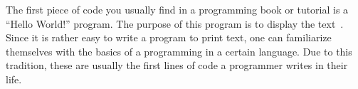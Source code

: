 
The first piece of code you usually find in a programming book or tutorial is a ``Hello World!'' program. The purpose of this program is to display the text \,. Since it is rather easy to write a program to print text, one can familiarize themselves with the basics of a programming in a certain language. Due to this tradition, these are usually the first lines of code a programmer writes in their life.
